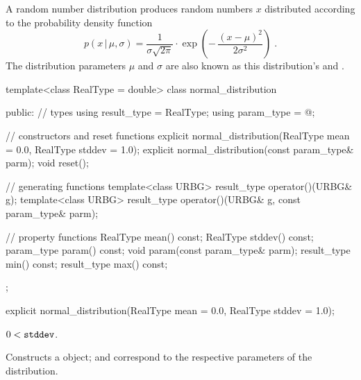 \pnum
A  random number distribution
produces random numbers $x$
distributed according to
the probability density function%
%
%
\[%
 p(x\,|\,\mu,\sigma)
      = \frac{1}{\sigma \sqrt{2\pi}}
        \cdot
        \exp{\left(- \, \frac{(x - \mu)^2}
                             {2 \sigma^2}
             \right)
            }
\; \mbox{.}
\]
The distribution parameters $\mu$ and $\sigma$
are also known as this distribution's %
%
and %
%
%
.

%
\begin{codeblock}
template<class RealType = double>
  class normal_distribution {
  public:
    // types
    using result_type = RealType;
    using param_type  = @\unspec@;

    // constructors and reset functions
    explicit normal_distribution(RealType mean = 0.0, RealType stddev = 1.0);
    explicit normal_distribution(const param_type& parm);
    void reset();

    // generating functions
    template<class URBG>
      result_type operator()(URBG& g);
    template<class URBG>
      result_type operator()(URBG& g, const param_type& parm);

    // property functions
    RealType mean() const;
    RealType stddev() const;
    param_type param() const;
    void param(const param_type& parm);
    result_type min() const;
    result_type max() const;
  };
\end{codeblock}


%
\begin{itemdecl}
explicit normal_distribution(RealType mean = 0.0, RealType stddev = 1.0);
\end{itemdecl}

\begin{itemdescr}
\pnum\requires
 $ 0 < \texttt{stddev} $.

\pnum\effects Constructs a  object;
  and 
 correspond to the respective parameters of the distribution.
\end{itemdescr}

